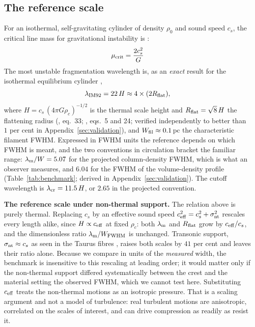 \documentclass[usenatbib,twoside,twocolumn]{mnras}
\begin{document}
\subsection{The reference scale}
\label{sec:reference}




For an isothermal, self-gravitating cylinder of density $\rho_0$ and sound speed $c_s$, the critical line mass for gravitational instability is \citep{Ostriker1964}:
\begin{equation}
\mu_{\rm crit} = \frac{2c_s^2}{G}
\label{eq:mucrit}
\end{equation}
The most unstable fragmentation wavelength is, as an \emph{exact} result for the isothermal equilibrium cylinder \citep{Inutsuka1992},
\begin{equation}
\lambda_{\rm IM92} = 22\,H \approx 4\times(2R_{\rm flat}),
\label{eq:lambdam}
\end{equation}
where $H = c_s\,(4\pi G\rho_c)^{-1/2}$ is the thermal scale height and $R_{\rm flat}=\sqrt8\,H$ the flattening radius (\citealt{Nagasawa1987}, eq.~33; \citealt{Fischera2012}, eqs.~5 and 24; verified independently to better than $1$ per cent in Appendix~\ref{sec:validation}), and $W_{\rm fil}\approx0.1$\,pc the characteristic filament FWHM. Expressed in FWHM units the reference depends on which FWHM is meant, and the two conventions in circulation bracket the familiar range: $\lambda_{\rm m}/W=5.07$ for the projected column-density FWHM, which is what an observer measures, and $6.04$ for the FWHM of the volume-density profile (Table~\ref{tab:benchmark}; derived in Appendix~\ref{sec:validation}). The cutoff wavelength is $\lambda_{\rm cr}=11.5\,H$, or $2.65$ in the projected convention. 

\smallskip\noindent\textbf{The reference scale under non-thermal support.} The relation above is purely thermal. Replacing $c_s$ by an effective sound speed $c_{\rm eff}^2=c_s^2+\sigma_{\rm nt}^2$ rescales every length alike, since $H\propto c_{\rm eff}$ at fixed $\rho_c$: both $\lambda_{\rm m}$ and $R_{\rm flat}$ grow by $c_{\rm eff}/c_s$, and the dimensionless ratio $\lambda_{\rm m}/W_{\rm FWHM}$ is unchanged. Transonic support, $\sigma_{\rm nt}\approx c_s$ as seen in the Taurus fibres \citep{Hacar2013}, raises both scales by $41$ per cent and leaves their ratio alone. Because we compare in units of the \emph{measured} width, the benchmark is insensitive to this rescaling at leading order; it would matter only if the non-thermal support differed systematically between the crest and the material setting the observed FWHM, which we cannot test here. Substituting $c_{\rm eff}$ treats the non-thermal motions as an isotropic pressure. That is a scaling argument and not a model of turbulence: real turbulent motions are anisotropic, correlated on the scales of interest, and can drive compression as readily as resist it.
\end{document}
